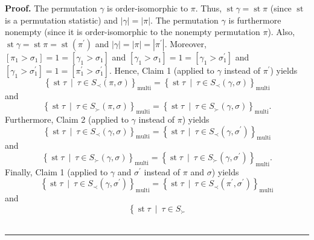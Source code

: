 \documentclass[numbers=enddot,12pt,final,onecolumn,notitlepage]{scrartcl}%
\theoremstyle{definition}
\newenvironment{proof}[1][Proof]{\noindent\textbf{#1.} }{\ \rule{0.5em}{0.5em}}
\begin{document}
\begin{proof}
The permutation $\gamma$ is order-isomorphic to $\pi$. Thus,
$\operatorname{st} \gamma = \operatorname{st} \pi$ (since $\operatorname{st}$
is a permutation statistic) and
$\left\vert \gamma\right\vert =\left\vert \pi\right\vert $. The permutation
$\gamma$ is furthermore nonempty (since it is order-isomorphic to the nonempty
permutation $\pi$). Also, $\operatorname{st} \gamma
=\operatorname{st} \pi =\operatorname{st}\left(  \pi^{\prime
}\right)  $ and $\left\vert \gamma\right\vert =\left\vert \pi\right\vert
=\left\vert \pi^{\prime}\right\vert $. Moreover, $\left[  \pi_{1}>\sigma
_{1}\right]  =1=\left[  \gamma_{1}>\sigma_{1}\right]  $ and $\left[
\gamma_{1}>\sigma_{1}\right]  =1=\left[  \gamma_{1}>\sigma_{1}^{\prime
}\right]  $ and
$\left[  \gamma_{1}>\sigma^{\prime}_{1}\right]  =1=\left[  \pi
_{1}^{\prime}>\sigma_{1}^{\prime}\right]  $. Hence, Claim 1 (applied to
$\gamma$ instead of $\pi^{\prime}$) yields%
\[
\left\{  \operatorname{st} \tau   \ \mid\ \tau\in S_{\prec
}\left(  \pi,\sigma\right)  \right\}  _{\operatorname*{multi}}=\left\{
\operatorname{st} \tau   \ \mid\ \tau\in S_{\prec}\left(
\gamma,\sigma\right)  \right\}  _{\operatorname*{multi}}%
\]
and%
\begin{equation}
\left\{  \operatorname{st} \tau   \ \mid\ \tau\in S_{\succ
}\left(  \pi,\sigma\right)  \right\}  _{\operatorname*{multi}}=\left\{
\operatorname{st} \tau   \ \mid\ \tau\in S_{\succ}\left(
\gamma,\sigma\right)  \right\}  _{\operatorname*{multi}}.\nonumber
\end{equation}
Furthermore, Claim 2 (applied to $\gamma$ instead of $\pi$) yields%
\[
\left\{  \operatorname{st} \tau   \ \mid\ \tau\in S_{\prec
}\left(  \gamma,\sigma\right)  \right\}  _{\operatorname*{multi}}=\left\{
\operatorname{st} \tau   \ \mid\ \tau\in S_{\prec}\left(
\gamma,\sigma^{\prime}\right)  \right\}  _{\operatorname*{multi}}%
\]
and%
\[
\left\{  \operatorname{st} \tau   \ \mid\ \tau\in S_{\succ
}\left(  \gamma,\sigma\right)  \right\}  _{\operatorname*{multi}}=\left\{
\operatorname{st} \tau   \ \mid\ \tau\in S_{\succ}\left(
\gamma,\sigma^{\prime}\right)  \right\}  _{\operatorname*{multi}}.
\]
Finally, Claim 1 (applied to $\gamma$ and $\sigma^{\prime}$ instead of $\pi$
and $\sigma$) yields%
\[
\left\{  \operatorname{st} \tau   \ \mid\ \tau\in S_{\prec
}\left(  \gamma,\sigma^{\prime}\right)  \right\}  _{\operatorname*{multi}%
}=\left\{  \operatorname{st} \tau   \ \mid\ \tau\in S_{\prec
}\left(  \pi^{\prime},\sigma^{\prime}\right)  \right\}
_{\operatorname*{multi}}%
\]
and%
\begin{equation}
\left\{  \operatorname{st} \tau   \ \mid\ \tau\in S_{\succ
}
\end{equation}
\end{proof}
\end{document}
